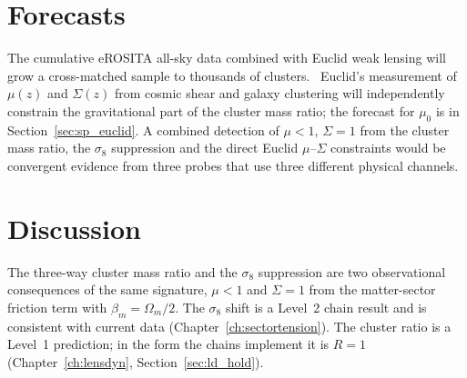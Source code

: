 \section{Forecasts}\label{sec:tw_forecasts}
The cumulative eROSITA all-sky data combined with Euclid weak lensing will grow a cross-matched sample to thousands of clusters. \prediction\ Euclid's
measurement of $\mu(z)$ and $\Sigma(z)$ from cosmic shear and galaxy clustering will independently constrain the gravitational part of the cluster mass
ratio; the forecast for $\mu_0$ is in Section~\ref{sec:sp_euclid}. A combined detection of $\mu<1$, $\Sigma=1$ from the cluster mass ratio, the
$\sigma_8$ suppression and the direct Euclid $\mu$--$\Sigma$ constraints would be convergent evidence from three probes that use three different
physical channels. \prediction

\section{Discussion}\label{sec:tw_discussion}
The three-way cluster mass ratio and the $\sigma_8$ suppression are two observational consequences of the same signature, $\mu<1$ and $\Sigma=1$ from
the matter-sector friction term with $\beta_m=\Omega_m/2$. The $\sigma_8$ shift is a Level~2 chain result and is consistent with current data
(Chapter~\ref{ch:sectortension}). The cluster ratio is a Level~1 prediction; in the form the chains implement it is $R=1$
(Chapter~\ref{ch:lensdyn}, Section~\ref{sec:ld_hold}). \openprob

